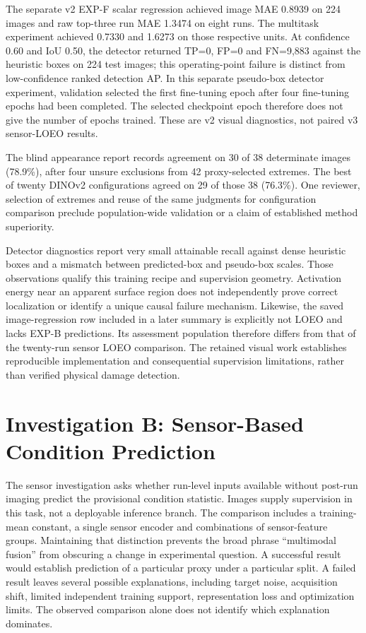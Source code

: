 The separate v2 EXP-F scalar regression achieved image MAE 0.8939 on 224 images
and raw top-three run MAE 1.3474 on eight runs. The multitask experiment achieved
0.7330 and 1.6273 on those respective units. At confidence 0.60 and IoU 0.50,
the detector returned TP=0, FP=0 and FN=9,883 against the heuristic boxes on 224 test
images; this operating-point failure is distinct from low-confidence ranked detection
AP. In this separate pseudo-box detector experiment, validation selected the first
fine-tuning epoch after four fine-tuning epochs had been completed. The selected
checkpoint epoch therefore does not give the number of epochs trained. These are v2
visual diagnostics, not paired v3 sensor-LOEO results.

The blind appearance report records agreement on 30 of 38 determinate images (78.9\%),
after four unsure exclusions from 42 proxy-selected extremes. The best of twenty
DINOv2 configurations agreed on 29 of those 38 (76.3\%). One reviewer, selection of
extremes and reuse of the same judgments for configuration comparison preclude
population-wide validation or a claim of established method superiority.

Detector diagnostics report very small attainable recall against dense heuristic boxes
and a mismatch between predicted-box and pseudo-box scales. Those observations qualify
this training recipe and supervision geometry. Activation energy near an apparent
surface region does not independently prove correct localization or identify a unique
causal failure mechanism. Likewise, the saved image-regression row included in a later
summary is explicitly not LOEO and lacks EXP-B predictions. Its assessment population
therefore differs from that of the twenty-run sensor LOEO comparison. The retained
visual work establishes reproducible implementation and consequential supervision
limitations, rather than verified physical damage detection.

\section{Investigation B: Sensor-Based Condition Prediction}
The sensor investigation asks whether run-level inputs available without post-run
imaging predict the provisional condition statistic. Images supply supervision in this
task, not a deployable inference branch. The comparison includes a training-mean
constant, a single sensor encoder and combinations of sensor-feature groups. Maintaining
that distinction prevents the broad phrase ``multimodal fusion'' from obscuring a change
in experimental question. A successful result would establish prediction of a particular
proxy under a particular split. A failed result leaves several possible explanations,
including target noise, acquisition shift, limited independent training support,
representation loss and optimization limits. The observed comparison alone does not
identify which explanation dominates.

